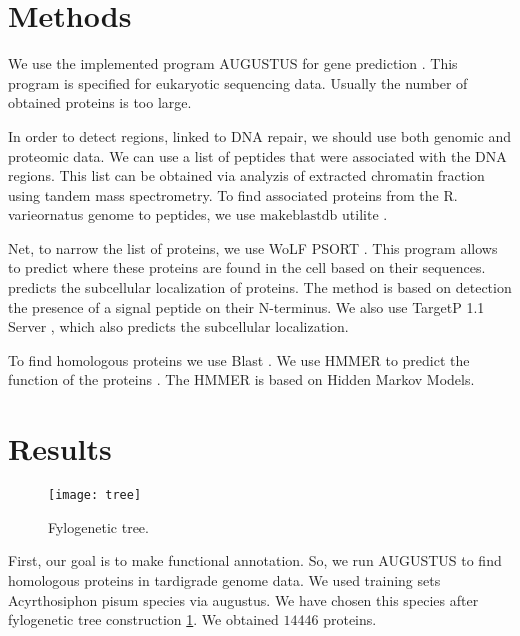 \documentclass{article}
\begin{document}
\section{Methods}
 We use the implemented program AUGUSTUS for gene prediction \cite{augustus}. This program is specified for eukaryotic sequencing data. Usually the number of obtained proteins is too large. 
 
 In order to detect regions, linked to DNA repair, we should use both genomic and proteomic data. We can use a list of peptides that were associated with the DNA regions. This list can be obtained via analyzis of extracted chromatin fraction using tandem mass spectrometry. To find associated proteins from the R. varieornatus genome  to peptides, we use $\textrm{makeblastdb}$ utilite \cite{blast}.
 
 Net, to narrow the list of proteins, we use WoLF PSORT \cite{WOlf}. This program allows to predict where these proteins are found in the cell based on their sequences. predicts the subcellular localization of proteins. The method is based on detection the presence of a signal peptide on their N-terminus. We also use TargetP 1.1 Server \cite{ptarget}, which also predicts the subcellular localization.
 
 To find homologous proteins we use Blast \cite{2}. We use HMMER to predict the function of the proteins \cite{HMM}. The HMMER is based on Hidden Markov Models.  
 

\section{Results}
 \begin{figure}[h]
 	\centering
 	\texttt{[image: tree]}  
 	\caption{ Fylogenetic tree.}
 	\label{tree}
 \end{figure}
  First, our goal is to make functional annotation. So, we run AUGUSTUS to find homologous proteins in tardigrade genome data. We used training sets  Acyrthosiphon pisum species via augustus. We have chosen this species after  fylogenetic tree construction \ref{tree}.   We obtained $14446$ proteins. 
 
\end{document}
